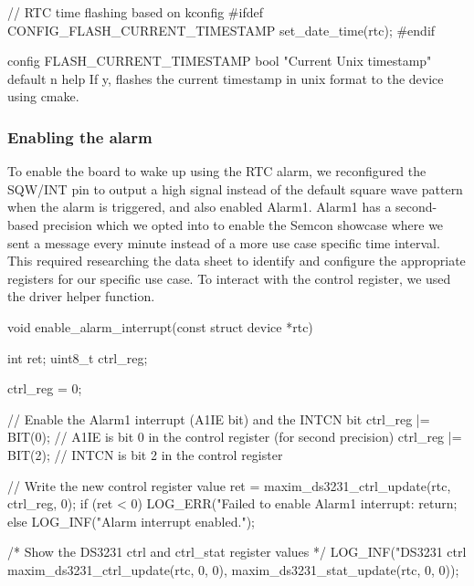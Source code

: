 \begin{cpp}[caption={check if the flag is set during node boot-up}]
    // RTC time flashing based on kconfig
#ifdef CONFIG_FLASH_CURRENT_TIMESTAMP
    set_date_time(rtc);
#endif
\end{cpp}

\begin{cpp}[caption={kconfig code to create the flag}]
      config FLASH_CURRENT_TIMESTAMP
    bool "Current Unix timestamp"
    default n
    help
      If y, flashes the current timestamp in unix format to the device using cmake.
\end{cpp}

\subsubsection{Enabling the alarm}

To enable the board to wake up using the RTC alarm, we reconfigured the SQW/INT pin to output a high signal instead of the default square wave pattern when the alarm is triggered, and also enabled Alarm1. Alarm1 has a second-based precision which we opted into to enable the Semcon showcase where we sent a message every minute instead of a more use case specific time interval. This required researching the data sheet to identify and configure the appropriate registers for our specific use case. To interact with the control register, we used the driver helper function.  

\begin{cpp}
    void enable_alarm_interrupt(const struct device *rtc)
{
    int ret;
    uint8_t ctrl_reg;


    ctrl_reg = 0;

    // Enable the Alarm1 interrupt (A1IE bit) and the INTCN bit
    ctrl_reg |= BIT(0); // A1IE is bit 0 in the control register (for second precision)
    ctrl_reg |= BIT(2); // INTCN is bit 2 in the control register

    // Write the new control register value
    ret = maxim_ds3231_ctrl_update(rtc, ctrl_reg, 0);
    if (ret < 0)
    {
        LOG_ERR("Failed to enable Alarm1 interrupt: %
        return;
    }
    else
    {
        LOG_INF("Alarm interrupt enabled.");
    }

    /* Show the DS3231 ctrl and ctrl_stat register values */
    LOG_INF("DS3231 ctrl %
            maxim_ds3231_ctrl_update(rtc, 0, 0),
            maxim_ds3231_stat_update(rtc, 0, 0));
}
\end{cpp}

